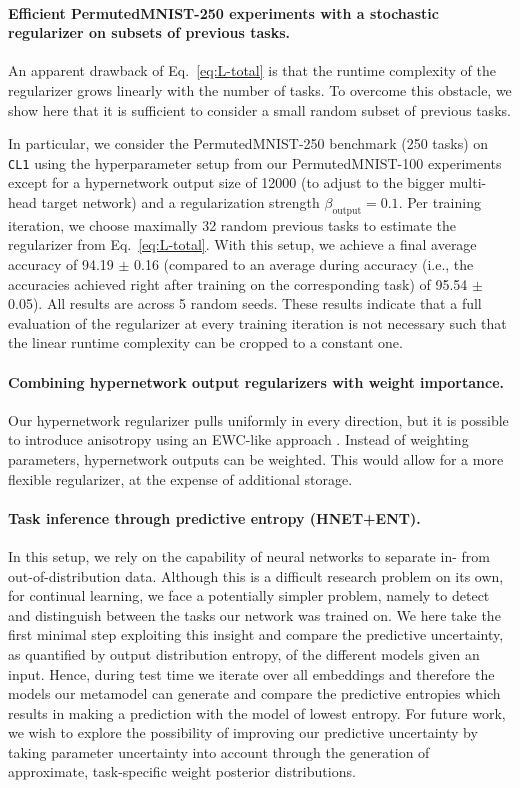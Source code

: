 \documentclass{article}
\begin{document}
\paragraph{Efficient PermutedMNIST-250 experiments with a stochastic regularizer on subsets of previous tasks.} An apparent drawback of Eq.~\ref{eq:L-total} is that the runtime complexity of the regularizer grows linearly with the number of tasks. To overcome this obstacle, we show here that it is sufficient to consider a small random subset of previous tasks.

In particular, we consider the PermutedMNIST-250 benchmark (250 tasks) on \texttt{CL1} using the hyperparameter setup from our PermutedMNIST-100 experiments except for a hypernetwork output size of 12000 (to adjust to the bigger multi-head target network) and a regularization strength $\beta_\text{output} = 0.1$. Per training iteration, we choose maximally 32 random previous tasks to estimate the regularizer from Eq.~\ref{eq:L-total}. With this setup, we achieve a final average accuracy of 94.19 $\pm$ 0.16 (compared to an average during accuracy (i.e., the accuracies achieved right after training on the corresponding task) of 95.54 $\pm$ 0.05). All results are across 5 random seeds. These results indicate that a full evaluation of the regularizer at every training iteration is not necessary such that the linear runtime complexity can be cropped to a constant one.

\paragraph{Combining hypernetwork output regularizers with weight importance.} Our hypernetwork regularizer pulls uniformly in every direction, but it is possible to introduce anisotropy using an EWC-like approach \citep{kirkpatrick_overcoming_2017}. Instead of weighting parameters, hypernetwork outputs can be weighted. This would allow for a more flexible regularizer, at the expense of additional storage.

\paragraph{Task inference through predictive entropy (HNET+ENT).} In this setup, we rely on the capability of neural networks to separate in- from out-of-distribution data. Although this is a difficult research problem on its own, for continual learning, we face a potentially simpler problem, namely to detect and distinguish between the tasks our network was trained on. We here take the first minimal step exploiting this insight and compare the predictive uncertainty, as quantified by output distribution entropy, of the different models given an input. Hence, during test time we iterate over all embeddings and therefore the models our metamodel can generate and compare the predictive entropies which results in making a prediction with the model of lowest entropy.
For future work, we wish to explore the possibility of improving our predictive uncertainty by taking parameter uncertainty into account through the generation of approximate, task-specific weight posterior distributions.
\end{document}
